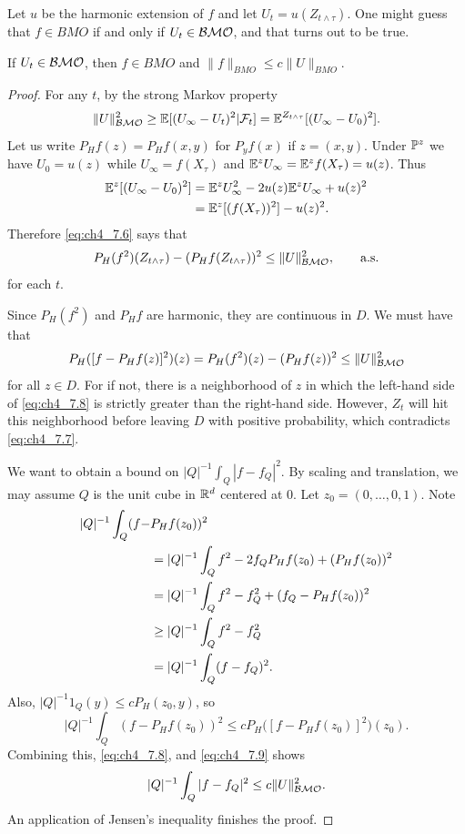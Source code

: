 Let $u$ be the harmonic extension of $f$ and let $U_t = u(Z_{t\wedge\tau})$. One might guess that $f \in BMO$ if and only if $U_t \in \BMO$, and that turns out to be true.

\begin{proposition}\label{prop:ch4_7.8}
If $U_t \in \BMO$, then $f \in BMO$ and $\|f\|_{BMO} \leq c\|U\|_{BMO}$.
\end{proposition}

\begin{proof}
For any $t$, by the strong Markov property
\begin{equation}\label{eq:ch4_7.6}
    \|U\|^2_{\BMO} \geq \E[(U_\infty - U_t)^2\mid \FC_t] = \E^{Z_{t\wedge\tau}}[(U_\infty - U_0)^2].
\end{equation}
Let us write $P_Hf(z) = P_Hf(x,y)$ for $P_yf(x)$ if $z = (x,y)$. Under $\P^z$ we have $U_0 = u(z)$ while $U_\infty = f(X_\tau)$ and $\E^zU_\infty = \E^zf(X_\tau) = u(z)$. Thus
\begin{align*}
    \E^z[(U_\infty - U_0)^2] &= \E^z U_\infty^2 -2u(z)\E^z U_\infty + u(z)^2 \\
    &= \E^z[(f(X_\tau))^2] - u(z)^2.
\end{align*}
Therefore \eqref{eq:ch4_7.6} says that
\begin{equation}\label{eq:ch4_7.7}
    P_H(f^2)(Z_{t\wedge\tau}) - (P_Hf(Z_{t\wedge\tau}))^2 \leq \|U\|^2_{\BMO}, \qquad \text{a.s.}
\end{equation}
for each $t$.

Since $P_H(f^2)$ and $P_Hf$ are harmonic, they are continuous in $D$. We must have that
\begin{equation}\label{eq:ch4_7.8}
    P_H([f - P_Hf(z)]^2)(z) = P_H(f^2)(z) - (P_Hf(z))^2 \leq \|U\|^2_{\BMO}
\end{equation}
for all $z \in D$. For if not, there is a neighborhood of $z$ in which the left-hand side of \eqref{eq:ch4_7.8} is strictly greater than the right-hand side. However, $Z_t$ will hit this neighborhood before leaving $D$ with positive probability, which contradicts \eqref{eq:ch4_7.7}.

We want to obtain a bound on $|Q|^{-1}\int_Q |f - f_Q|^2$. By scaling and translation, we may assume $Q$ is the unit cube in $\R^d$ centered at $0$. Let $z_0 = (0,\ldots,0,1)$. Note
\begin{align}\label{eq:ch4_7.9}
    |Q|^{-1}\int_Q (f-&P_Hf(z_0))^2 \\
    &= |Q|^{-1}\int_Q f^2 - 2f_QP_Hf(z_0) + (P_Hf(z_0))^2 \notag \\
    &= |Q|^{-1}\int_Q f^2 - f_Q^2 + (f_Q - P_Hf(z_0))^2 \notag \\
    &\geq |Q|^{-1}\int_Q f^2 - f_Q^2 \notag \\
    &= |Q|^{-1}\int_Q (f - f_Q)^2. \notag
\end{align}
Also, $|Q|^{-1}1_Q(y) \leq cP_H(z_0,y)$, so
\[
    |Q|^{-1}\int_Q (f - P_Hf(z_0))^2 \leq cP_H\big([f - P_Hf(z_0)]^2\big)(z_0).
\]
Combining this, \eqref{eq:ch4_7.8}, and \eqref{eq:ch4_7.9} shows
\[
    |Q|^{-1}\int_Q |f - f_Q|^2 \leq c\|U\|^2_{\BMO}.
\]
An application of Jensen's inequality finishes the proof.
\end{proof}

